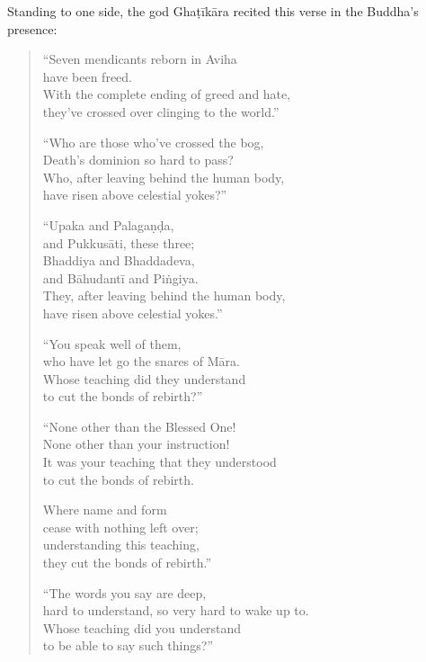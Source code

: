 \documentclass[12pt,openany]{book}%
\begin{document}
Standing to one side, the god \textsanskrit{Ghaṭīkāra} recited this verse in the Buddha’s presence: 

\begin{verse}%
“Seven mendicants reborn in Aviha \\
have been freed. \\
With the complete ending of greed and hate, \\
they’ve crossed over clinging to the world.” 

“Who are those who’ve crossed the bog, \\
Death’s dominion so hard to pass? \\
Who, after leaving behind the human body, \\
have risen above celestial yokes?” 

“Upaka and \textsanskrit{Palagaṇḍa}, \\
and \textsanskrit{Pukkusāti}, these three; \\
Bhaddiya and Bhaddadeva, \\
and \textsanskrit{Bāhudantī} and \textsanskrit{Piṅgiya}. \\
They, after leaving behind the human body, \\
have risen above celestial yokes.” 

“You speak well of them, \\
who have let go the snares of \textsanskrit{Māra}. \\
Whose teaching did they understand \\
to cut the bonds of rebirth?” 

“None other than the Blessed One! \\
None other than your instruction! \\
It was your teaching that they understood \\
to cut the bonds of rebirth. 

Where name and form \\
cease with nothing left over; \\
understanding this teaching, \\
they cut the bonds of rebirth.” 

“The words you say are deep, \\
hard to understand, so very hard to wake up to. \\
Whose teaching did you understand \\
to be able to say such things?” 


\end{verse}
\end{document}
